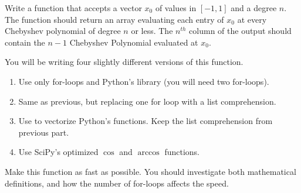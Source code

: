 \begin{problem}
Write a function that accepts a vector $x_0$ of values in $[-1,1]$ and a degree $n$.  The function should return an array evaluating each entry of $x_0$ at every Chebyshev polynomial of degree $n$ or less. The $n^{th}$ column of the output should contain the $n-1$ Chebyshev Polynomial evaluated at $x_0$.

You will be writing four slightly different versions of this function.
\begin{enumerate}
\item Use only for-loops and Python's  library (you will need two for-loops).
\item Same as previous, but replacing one for loop with a list comprehension.
\item Use  to vectorize Python's  functions.  Keep the list comprehension from previous part.
\item Use SciPy's optimized $\cos$ and $\arccos$ functions.
\end{enumerate}

Make this function as fast as possible. You should investigate both mathematical definitions, and how the number of for-loops affects the speed.
\end{problem}
